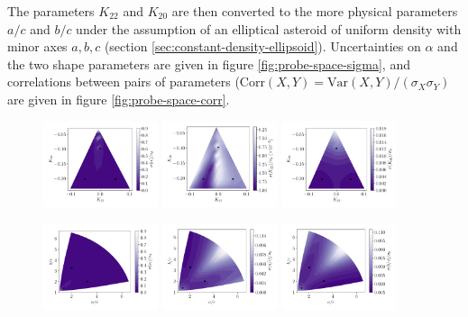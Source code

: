\documentclass[linenumbers]{aastex631}
\begin{document}
The parameters $K_{22}$ and $K_{20}$ are then converted to the more physical parameters $a/c$ and $b/c$ under the assumption of an elliptical asteroid of uniform density with minor axes $a, b, c$ (section \ref{sec:constant-density-ellipsoid}). Uncertainties on $\alpha$ and the two shape parameters are given in figure \ref{fig:probe-space-sigma}, and correlations between pairs of parameters ($\mathrm{Corr}(X, Y) = \mathrm{Var}(X, Y) / (\sigma_X \sigma_Y)$ are given in figure \ref{fig:probe-space-corr}. 
\begin{figure}
  \includegraphics[width=0.3\textwidth]{probe-space-theta-1-sigma.pdf}\hfill
  \includegraphics[width=0.3\textwidth]{probe-space-theta-2-sigma.pdf}\hfill
  \includegraphics[width=0.3\textwidth]{probe-space-theta-3-sigma.pdf}

  \includegraphics[width=0.3\textwidth]{probe-space-ab-1-sigma.pdf}\hfill
  \includegraphics[width=0.3\textwidth]{probe-space-ab-a-sigma.pdf}\hfill
  \includegraphics[width=0.3\textwidth]{probe-space-ab-b-sigma.pdf}


\end{figure}
\end{document}
